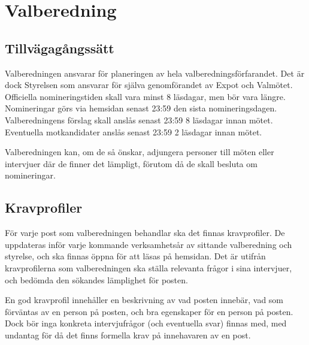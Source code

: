 \documentclass[10pt]{article}
\begin{document}
\section{Valberedning} %
\subsection{Tillvägagångssätt}
Valberedningen ansvarar för planeringen av hela valberedningsförfarandet. Det är dock Styrelsen som ansvarar för själva genomförandet av Expot och Valmötet. Officiella nomineringstiden skall vara minst 8 läsdagar, men bör vara längre. Nomineringar görs via hemsidan senast 23:59 den sista nomineringsdagen. Valberedningens förslag skall anslås senast 23:59 8 läsdagar innan mötet. Eventuella motkandidater anslås senast 23:59 2 läsdagar innan mötet.

Valberedningen kan, om de så önskar, adjungera personer till möten eller intervjuer där de finner det lämpligt, förutom då de skall besluta om nomineringar.
\subsection{Kravprofiler}
För varje post som valberedningen behandlar ska det finnas kravprofiler. De uppdateras inför varje kommande verksamhetsår av sittande valberedning och styrelse, och ska finnas öppna för att läsas på hemsidan. Det är utifrån kravprofilerna som valberedningen ska ställa relevanta frågor i sina intervjuer, och bedömda den sökandes lämplighet för posten.

En god kravprofil innehåller en beskrivning av vad posten innebär, vad som förväntas av en person på posten, och bra egenskaper för en person på posten. Dock bör inga konkreta intervjufrågor (och eventuella svar) finnas med, med undantag för då det finns formella krav på innehavaren av en post.
\end{document}
